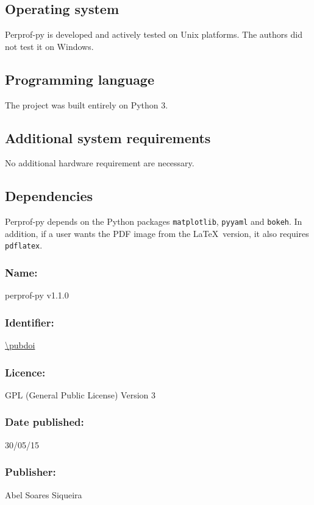 \subsection*{Operating system}

    Perprof-py is developed and actively tested on Unix platforms.
    The authors did not test it on Windows.

\subsection*{Programming language}

    The project was built entirely on Python 3.

\subsection*{Additional system requirements}

    No additional hardware requirement are necessary.

\subsection*{Dependencies}

    Perprof-py depends on the Python packages \texttt{matplotlib}, \texttt{pyyaml} and \texttt{bokeh}.
    In addition, if a user wants the PDF image from the \LaTeX\
    version, it also requires \texttt{pdflatex}.

\Archive

    \subsubsection*{Name:} perprof-py v1.1.0

    \subsubsection*{Identifier:} \url{\pubdoi}

    \subsubsection*{Licence:} GPL (General Public License) Version 3

    \subsubsection*{Date published:} 30/05/15

    \subsubsection*{Publisher:} Abel Soares Siqueira

